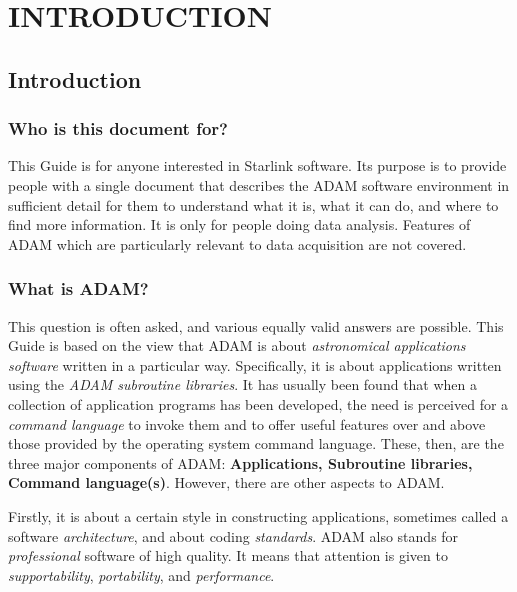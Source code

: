 \part{INTRODUCTION}
\pagestyle{myheadings}

\chapter{Introduction}
\label{C_intro}

\section{Who is this document for?}
\label{S_who}

This Guide is for anyone interested in Starlink software.
Its purpose is to provide people with a single document that describes the
ADAM software environment in sufficient detail for them to understand what it
is, what it can do, and where to find more information.
It is only for people doing data analysis.
Features of ADAM which are particularly relevant to data acquisition are not
covered.
  
\section{What is ADAM?}
\label{S_what}

This question is often asked, and various equally valid answers are possible. 
This Guide is based on the view that ADAM is about {\em astronomical
applications software} written in a particular way.
Specifically, it is about applications written using the {\em ADAM subroutine 
libraries}.
It has usually been found that when a collection of application programs has
been developed, the need is perceived for a {\em command language} to invoke
them and to offer useful features over and above those provided by the
operating system command language.  
These, then, are the three major components of ADAM: {\bf Applications,
Subroutine libraries, Command language(s)}\@.
However, there are other aspects to ADAM. 

Firstly, it is about a certain style in constructing applications, sometimes
called a software {\em architecture}, and about coding {\em standards}.
ADAM also stands for {\em professional} software of high quality.
It means that attention is given to {\em supportability}, {\em
portability}, and {\em performance}. 

